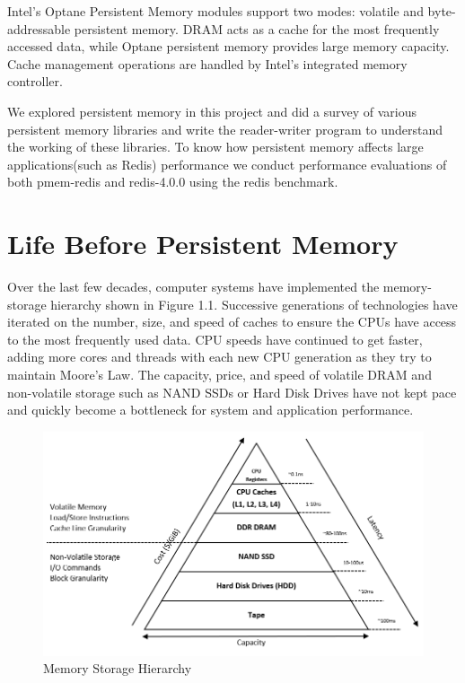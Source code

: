 \documentclass[11pt,swedish, openany, oneside]{book}
\let\cleardoublepage\clearpage
\begin{document}
Intel’s Optane Persistent Memory modules support two modes: volatile and byte-addressable persistent memory. DRAM acts as a cache for the most frequently accessed data, while Optane persistent memory provides large memory capacity. Cache management operations are handled by Intel's integrated memory controller.

We explored persistent memory in this project and did a survey of various persistent memory libraries and write the reader-writer program to understand the working of these libraries. To know how persistent memory affects large applications(such as Redis) performance we conduct performance evaluations of both pmem-redis and redis-4.0.0 using the redis benchmark.


\let\cleardoublepage\clearpage
\tableofcontents{}

\clearpage
\listoffigures
{}
\mainmatter


\chapter{Life Before Persistent Memory}
Over the last few decades, computer systems have implemented the memory-storage hierarchy shown in Figure 1.1. Successive generations of technologies have iterated on the number, size, and speed of caches to ensure the CPUs have access to the most frequently used data. CPU speeds have continued to get faster, adding more cores and threads with each new CPU generation as they try to maintain Moore's Law. The capacity, price, and speed of volatile DRAM and non-volatile storage such as NAND SSDs or Hard Disk Drives have not kept pace and quickly become a bottleneck for system and application performance.\cite{pmemdoc}

\begin{figure}[H]
   \centering
   \includegraphics[width=0.6\linewidth]{lbpm1.png}
   \caption{Memory Storage Hierarchy\cite{pmemdoc}}
\end{figure}
\end{document}
